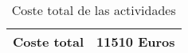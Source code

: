 \begin{table}[h]
    \centering
    \begin{tabular}{|c|c|}
    \hline
    Coste total & 11510 Euros \\ \hline
    \end{tabular}
    \caption {Coste total de las actividades}
\end{table}